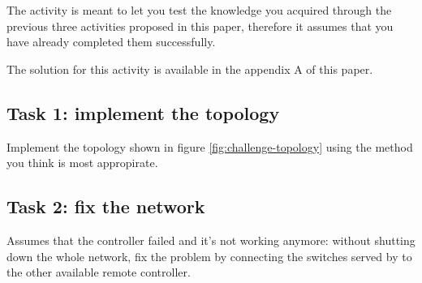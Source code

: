 The activity is meant to let you test the knowledge you acquired through the
previous three activities proposed in this paper, therefore it assumes that you
have already completed them successfully.

The solution for this activity is available in the appendix A of this paper.



\subsection*{Task 1: implement the topology}
Implement the topology shown in figure \ref{fig:challenge-topology} using the method
you think is most appropirate.

\subsection*{Task 2: fix the network}
Assumes that the controller  failed and it's not working anymore: without
shutting down the whole network, fix the problem by connecting the switches served by 
to the other available remote controller.
